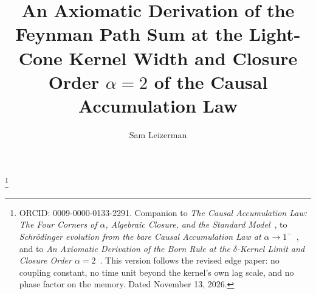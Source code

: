 \documentclass[11pt]{amsart}
\theoremstyle{definition}
\theoremstyle{remark}
\begin{document}
\title[The Feynman path sum at $\alpha=2$ of the CAL]{An Axiomatic Derivation of the Feynman Path Sum at the Light-Cone Kernel Width and Closure Order $\alpha=2$ of the Causal Accumulation Law}

\author{Sam Leizerman}
\address{LIOR Research Initiative}
\thanks{ORCID: 0009-0000-0133-2291. Companion to \emph{The Causal Accumulation Law: The Four Corners of $\alpha$, Algebraic Closure, and the Standard Model}~\cite{CAL}, to \emph{Schr\"odinger evolution from the bare Causal Accumulation Law at $\alpha\to1^-$}~\cite{Edge}, and to \emph{An Axiomatic Derivation of the Born Rule at the $\delta$-Kernel Limit and Closure Order $\alpha=2$}~\cite{Born}. This version follows the revised edge paper: no coupling constant, no time unit beyond the kernel's own lag scale, and no phase factor on the memory. Dated November 13, 2026.}
\end{document}
